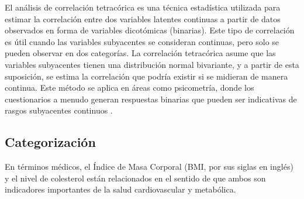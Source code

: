 \documentclass[10pt,journal,compsoc]{IEEEtran}
\begin{document}
El análisis de correlación tetracórica es una técnica estadística utilizada para estimar la correlación entre dos variables latentes continuas a partir de datos observados en forma de variables dicotómicas (binarias). Este tipo de correlación es útil cuando las variables subyacentes se consideran continuas, pero solo se pueden observar en dos categorías. La correlación tetracórica asume que las variables subyacentes tienen una distribución normal bivariante, y a partir de esta suposición, se estima la correlación que podría existir si se midieran de manera continua. Este método se aplica en áreas como psicometría, donde los cuestionarios a menudo generan respuestas binarias que pueden ser indicativas de rasgos subyacentes continuos \cite{olsson1979maximum}.

\subsection{Categorización}
En términos médicos, el Índice de Masa Corporal (BMI, por sus siglas en inglés) y el nivel de colesterol están relacionados en el sentido de que ambos son indicadores importantes de la salud cardiovascular y metabólica.
\end{document}

